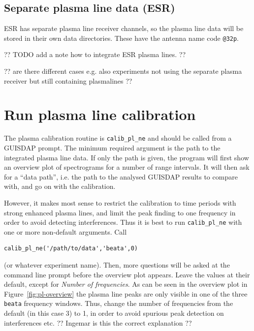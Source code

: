 \documentclass[a4]{article}
\begin{document}
\subsection{Separate plasma line data (ESR)}
\label{sec:separate-plasma-line}

ESR has separate plasma line receiver channels, so the plasma line
data will be stored in their own data directories. These have the
antenna name code \texttt{@32p}.

?? TODO add a note how to integrate ESR plasma lines. ??

?? are there different cases e.g. also experiments not using the
separate plasma receiver but still containing plasmalines ??


\clearpage{}

\section{Run plasma line calibration}
\label{sec:run-plasma-line}

The plasma calibration routine is \texttt{calib\_pl\_ne} and should be
called from a GUISDAP prompt.  The minimum required argument is the
path to the integrated plasma line data. If only the path is given,
the program will first show an overview plot of spectrograms for a
number of range intervals. It will then ask for a ``data path'',
i.e. the path to the analysed GUISDAP results to compare with, and go
on with the calibration.

However, it makes most sense to restrict the calibration to time
periods with strong enhanced plasma lines, and limit the peak finding
to one frequency in order to avoid detecting interferences. Thus it is
best to run  \texttt{calib\_pl\_ne} with one or more non-default arguments. Call

\begin{verbatim}
calib_pl_ne('/path/to/data','beata',0)
\end{verbatim}

(or whatever experiment name). Then, more questions will be asked at
the command line prompt before the overview plot appears.  Leave the
values at their default, except for \emph{Number of frequencies}. As
can be seen in the overview plot in Figure~\ref{fig:pl-overview} the
plasma line peaks are only visible in one of the three \texttt{beata}
frequency windows. Thus, change the number of frequencies from the
default (in this case 3) to 1, in order to avoid spurious peak
detection on interferences etc. ??  Ingemar is this the correct
explanation ??
\end{document}
